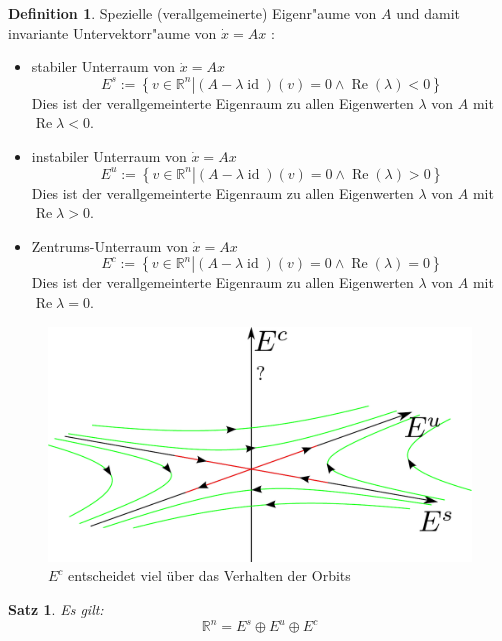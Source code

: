 \documentclass[a4paper, 13pt]{scrreprt}
\newtheorem{satz}{Satz}[section]
\theoremstyle{definition} \newtheorem{definition}{Definition}[section]
\newcommand{\RR}{\mathbb{R}}
\begin{document}
\begin{definition}
	Spezielle (verallgemeinerte) Eigenr"aume von \(A\) und damit invariante Untervektorr"aume von \(\dot{x}=Ax\) : 
	\begin{itemize} 
		\item stabiler Unterraum von \(\dot{x}=Ax\)
			$$E^s := \left\{\left. v\in \RR^n \right| (A-\lambda \operatorname{id})(v) = 0 \land \operatorname{Re}(\lambda) < 0\right\}$$ 
			Dies ist der verallgemeinterte Eigenraum zu allen Eigenwerten $\lambda$ von $A$ mit $\operatorname{Re}\lambda < 0$.
		\item instabiler Unterraum von \(\dot{x}=Ax\)
		$$E^u := \left\{\left. v\in \RR^n \right| (A-\lambda \operatorname{id})(v) = 0 \land \operatorname{Re}(\lambda) > 0\right\}$$ 
			Dies ist der verallgemeinterte Eigenraum zu allen Eigenwerten $\lambda$ von $A$ mit $\operatorname{Re}\lambda > 0$.
		\item Zentrums-Unterraum von \(\dot{x}=Ax\)
		$$E^c := \left\{\left. v\in \RR^n \right| (A-\lambda \operatorname{id})(v) = 0 \land \operatorname{Re}(\lambda) = 0\right\}$$ 
			Dies ist der verallgemeinterte Eigenraum zu allen Eigenwerten $\lambda$ von $A$ mit $\operatorname{Re}\lambda = 0$.
	\end{itemize}
\end{definition}
\begin{figure}[htpb]
		\centering
		\includegraphics[height=0.30\textheight]{img/eigenraeume.pdf}
		\caption{$E^c$ entscheidet viel über das Verhalten der Orbits}
\end{figure}

\begin{satz}
Es gilt: 
	\[\RR^n = E^s \oplus E^u \oplus E^c \]
\end{satz}
\end{document}
